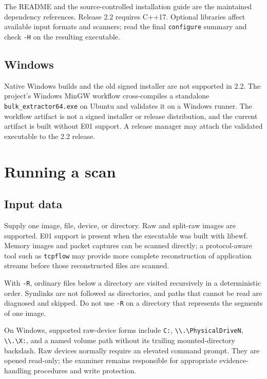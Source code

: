 \documentclass[11pt]{article}
\newcommand{\code}[1]{\texttt{#1}}
\begin{document}
The README and the source-controlled installation guide are the maintained
dependency references.
Release 2.2 requires C++17. Optional libraries affect available input formats
and scanners; read the final \code{configure} summary and check \code{-H} on
the resulting executable.

\subsection{Windows}

Native Windows builds and the old signed installer are not supported in 2.2.
The project's Windows MinGW workflow cross-compiles a standalone
\code{bulk\_extractor64.exe} on Ubuntu and validates it on a Windows runner.
The workflow artifact is not a signed installer or release distribution, and
the current artifact is built without E01 support. A release manager may
attach the validated executable to the 2.2 release.

\section{Running a scan}

\subsection{Input data}

Supply one image, file, device, or directory. Raw and split-raw images are
supported. E01 support is present when the executable was built with libewf.
Memory images and packet captures can be scanned directly; a protocol-aware
tool such as \code{tcpflow} may provide more complete reconstruction of
application streams before those reconstructed files are scanned.

With \code{-R}, ordinary files below a directory are visited recursively in a
deterministic order. Symlinks are not followed as directories, and paths that
cannot be read are diagnosed and skipped. Do not use \code{-R} on a directory
that represents the segments of one image.

On Windows, supported raw-device forms include \code{C:},
\verb|\\.\PhysicalDriveN|, \verb|\\.\X:|, and a named volume path
without its trailing mounted-directory backslash. Raw devices normally require
an elevated command prompt. They are opened read-only; the examiner remains
responsible for appropriate evidence-handling procedures and write protection.
\end{document}
